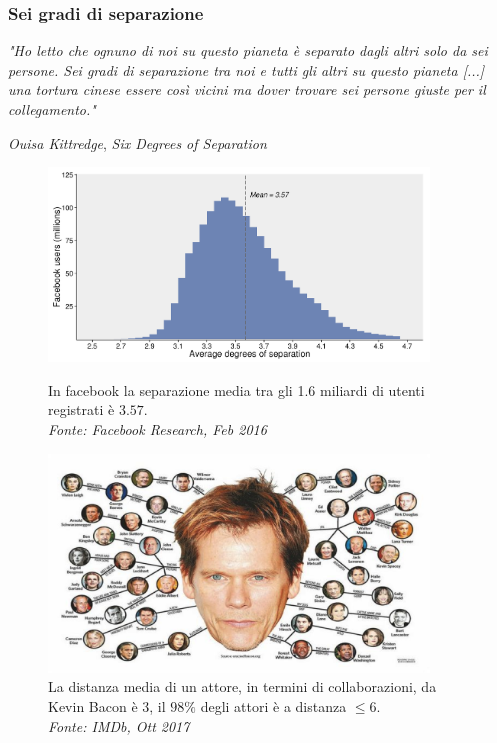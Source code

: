  \begin{frame}
 	\frametitle{Sei gradi di separazione}
 	\textit{"Ho letto che ognuno di noi su questo pianeta è separato dagli altri solo da sei persone. 
 		Sei gradi di separazione tra noi e tutti gli altri su questo pianeta [...]\\ una tortura cinese essere così vicini ma dover trovare sei persone giuste per il collegamento."}
 	\begin{flushright}
 		\small \textit{Ouisa Kittredge}, \textit{Six Degrees of Separation}
 	\end{flushright}
 	
 	\pause
 	
 	\begin{figure}[h]
 		\centering
 		\begin{minipage}[t]{.49\textwidth}
 			\centering
 			\includegraphics[width=0.9\textwidth]{images/facebook}
 			\caption{In facebook la separazione media tra gli 1.6 miliardi di utenti registrati è $3.57$.\\ \textit{Fonte: Facebook Research, Feb 2016}}
 		\end{minipage}\hfill
 		\pause
 		\begin{minipage}[t]{.49\textwidth}
 			\centering
 			\includegraphics[width=0.9\textwidth]{images/2_kevin_bacon}
 			\caption{La distanza media di un attore, in termini di collaborazioni, da Kevin Bacon è $3$, il $98\%$ degli attori è a distanza $\leq 6$.\\ \textit{Fonte: IMDb, Ott 2017}}
 		\end{minipage}
 	\end{figure}
 	
 \end{frame}
 